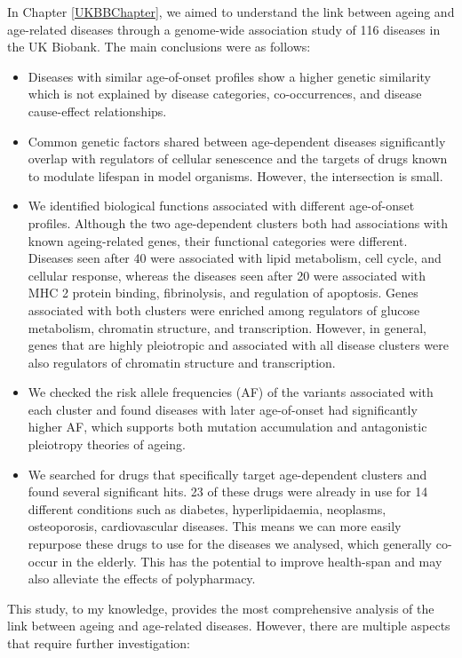 \documentclass[12pt,twoside]{unicam}
\providecommand{\tightlist}{%
  \setlength{\itemsep}{0pt}\setlength{\parskip}{0pt}}
\begin{document}
In Chapter \ref{UKBBChapter}, we aimed to understand the link between ageing and age-related diseases through a genome-wide association study of 116 diseases in the UK Biobank. The main conclusions were as follows:

\begin{itemize}
\tightlist
\item
  Diseases with similar age-of-onset profiles show a higher genetic similarity which is not explained by disease categories, co-occurrences, and disease cause-effect relationships.
\item
  Common genetic factors shared between age-dependent diseases significantly overlap with regulators of cellular senescence and the targets of drugs known to modulate lifespan in model organisms. However, the intersection is small.
\item
  We identified biological functions associated with different age-of-onset profiles. Although the two age-dependent clusters both had associations with known ageing-related genes, their functional categories were different. Diseases seen after 40 were associated with lipid metabolism, cell cycle, and cellular response, whereas the diseases seen after 20 were associated with MHC 2 protein binding, fibrinolysis, and regulation of apoptosis. Genes associated with both clusters were enriched among regulators of glucose metabolism, chromatin structure, and transcription. However, in general, genes that are highly pleiotropic and associated with all disease clusters were also regulators of chromatin structure and transcription.
\item
  We checked the risk allele frequencies (AF) of the variants associated with each cluster and found diseases with later age-of-onset had significantly higher AF, which supports both mutation accumulation and antagonistic pleiotropy theories of ageing.
\item
  We searched for drugs that specifically target age-dependent clusters and found several significant hits. 23 of these drugs were already in use for 14 different conditions such as diabetes, hyperlipidaemia, neoplasms, osteoporosis, cardiovascular diseases. This means we can more easily repurpose these drugs to use for the diseases we analysed, which generally co-occur in the elderly. This has the potential to improve health-span and may also alleviate the effects of polypharmacy.
\end{itemize}

This study, to my knowledge, provides the most comprehensive analysis of the link between ageing and age-related diseases. However, there are multiple aspects that require further investigation:
\end{document}
